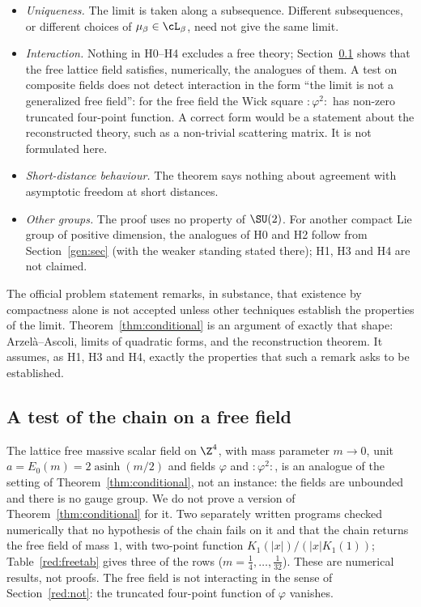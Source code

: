 \begin{itemize}
\item \emph{Uniqueness.} The limit is taken along a subsequence. Different subsequences, or different choices of $\mu_\beta\in\cL_\beta$, need not give the same limit.
\item \emph{Interaction.} Nothing in H0--H4 excludes a free theory; Section~\ref{red:free} shows that the free lattice field satisfies, numerically, the analogues of them. A test on composite fields does not detect interaction in the form ``the limit is not a generalized free field'': for the free field the Wick square $:\!\varphi^2\!:$ has non-zero truncated four-point function. A correct form would be a statement about the reconstructed theory, such as a non-trivial scattering matrix. It is not formulated here.
\item \emph{Short-distance behaviour.} The theorem says nothing about agreement with asymptotic freedom at short distances.
\item \emph{Other groups.} The proof uses no property of $\SU(2)$. For another compact Lie group of positive dimension, the analogues of H0 and H2 follow from Section~\ref{gen:sec} (with the weaker standing stated there); H1, H3 and H4 are not claimed.
\end{itemize}
The official problem statement \cite{JW} remarks, in substance, that existence by compactness alone is not accepted unless other techniques establish the properties of the limit. Theorem~\ref{thm:conditional} is an argument of exactly that shape: Arzel\`a--Ascoli, limits of quadratic forms, and the reconstruction theorem. It assumes, as H1, H3 and H4, exactly the properties that such a remark asks to be established.

\subsection{A test of the chain on a free field}\label{red:free}

The lattice free massive scalar field on $\Z^4$, with mass parameter $m\to0$, unit $a=E_0(m)=2\operatorname{asinh}(m/2)$ and fields $\varphi$ and $:\!\varphi^2\!:$, is an analogue of the setting of Theorem~\ref{thm:conditional}, not an instance: the fields are unbounded and there is no gauge group. We do not prove a version of Theorem~\ref{thm:conditional} for it. Two separately written programs checked numerically that no hypothesis of the chain fails on it and that the chain returns the free field of mass $1$, with two-point function $K_1(|x|)/(|x|K_1(1))$; Table~\ref{red:freetab} gives three of the rows ($m=\tfrac14,\dots,\tfrac1{32}$). These are numerical results, not proofs. The free field is not interacting in the sense of Section~\ref{red:not}: the truncated four-point function of $\varphi$ vanishes.

